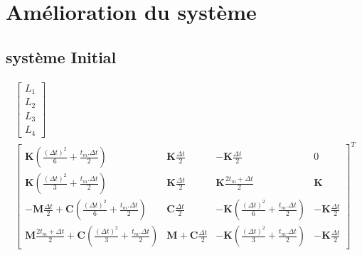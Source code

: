 \documentclass[12pt,a4paper]{report}
\begin{document}
\section{Amélioration du système}

\subsection{système Initial}
\begin{equation}
\begin{array}{c}
	\begin{bmatrix}	
		  L_1
		\\L_2
		\\L_3
		\\L_4
	\end{bmatrix}
	\\
		\begin{bmatrix}	   
		   \mathbf{K}
			   \left( \frac{(\Delta t)^2}{6} + \frac{t_m.\Delta t}{2}
			   \right)
			&
		   \mathbf{K} \frac{\Delta t}{2}
		   &   
		   - \mathbf{K} \frac{\Delta t}{2} 
			&
		   0
		\\   
		   \mathbf{K}
			   \left( \frac{(\Delta t)^2}{3} + \frac{t_m.\Delta t}{2}
			   \right)
			&
		   \mathbf{K} \frac{\Delta t}{2} 
		   &
		   \mathbf{K}
			   		\frac{2t_m + \Delta t}{2}
			&
		   \mathbf{K}
		\\   
		   -\mathbf{M}
		   		\frac{\Delta t}{2} 
		   +\mathbf{C}
		   		\left( \frac{(\Delta t)^2}{6} + \frac{t_m.\Delta t}{2} \right)  
		   & 
		   \mathbf{C} \frac{\Delta t}{2}
		   &
		   -\mathbf{K}
		   		(\frac{(\Delta t)^2}{6} + \frac{t_m.\Delta t}{2})
		   &
		   -\mathbf{K} \frac{\Delta t}{2}
		\\   
		   \mathbf{M}
		   		\frac{2t_m + \Delta t}{2} 
		   +\mathbf{C}
		   		\left( \frac{(\Delta t)^2}{3} + \frac{t_m.\Delta t}{2}\right)
		   &
		   \mathbf{M} 
		   +\mathbf{C} \frac{\Delta t}{2}
		   &
		   -\mathbf{K}
		   		(\frac{(\Delta t)^2}{3} + \frac{t_m.\Delta t}{2})
		   		&
		   -\mathbf{K} \frac{\Delta t}{2}
	\end{bmatrix}^T
\end{array}
\end{equation}
\end{document}
